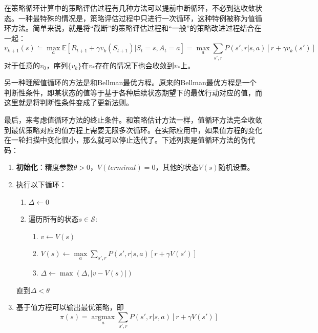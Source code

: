 \documentclass{ctexart}
\begin{document}
            在策略循环计算中的策略评估过程有几种方法可以提前中断循环，不必到达收敛状态。一种最特殊的情况是，策略评估过程中只进行一次循环，这种特例被称为值循环方法。简单来说，就是将“截断”的策略评估过程和“一般”的策略改进过程结合在一起：
            \begin{equation}
                v_{k+1}(s) \dot{=} \operatorname*{max}\limits_{a}\mathbb{E}[R_{t+1} + \gamma v_k(S_{t+1})|S_t=s,A_t=a]
                     = \operatorname*{max}\limits_{a} \sum_{s',r} P(s',r|s,a)[r+\gamma v_k(s')]
                \label{e4.10}
            \end{equation}
            对于任意的$v_0$，序列$\{v_k\}$在$v_*$存在的情况下也会收敛到$v_*$上。

            另一种理解值循环的方法是和Bellman最优方程。原来的Bellman最优方程是一个判断性条件，即某状态的值等于基于各种后续状态期望下的最优行动对应的值，而这里就是将判断性条件变成了更新法则。

            最后，来考虑值循环方法的终止条件。和策略估计方法一样，值循环方法完全收敛到最优策略对应的值方程上需要无限多次循环。在实际应用中，如果值方程的变化在一轮扫描中变化很小，那么就可以停止迭代了。下述列表是值循环方法的伪代码：
            \begin{enumerate}
                \item \textbf{初始化}：精度参数$\theta>0$，$V(terminal)=0$，其他的状态$V(s)$随机设置。
                \item 执行以下循环：
                \begin{enumerate}
                    \item $\Delta \leftarrow 0$
                    \item 遍历所有的状态$s\in \mathcal{S}$:
                    \begin{enumerate}
                        \item $v \leftarrow V(s)$
                        \item $V(s) \leftarrow \operatorname*{max}\limits_{a} \sum_{s',r} P(s',r|s,a)[r + \gamma V(s')]$
                        \item $\Delta \leftarrow \operatorname*{max}(\Delta,|v-V(s)|)$
                    \end{enumerate}
                \end{enumerate}

                 直到$\Delta < \theta$
                \item 基于值方程可以输出最优策略，即
                $$\pi(s) = \operatorname*{argmax}\limits_{a} \sum_{s',r} P(s',r|s,a)[r + \gamma V(s')] $$
            \end{enumerate}
\end{document}
